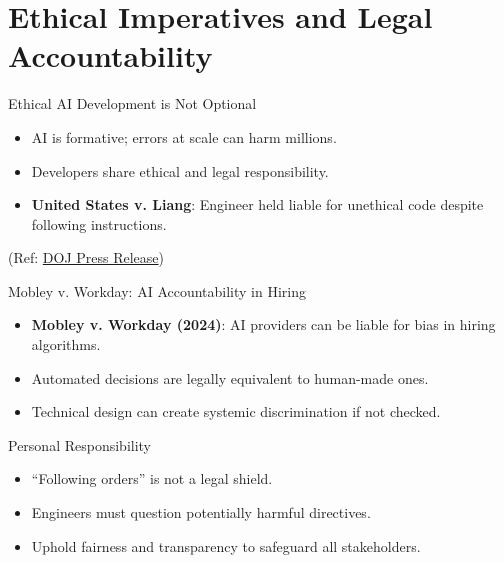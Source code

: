 \documentclass[aspectratio=169]{beamer}
\begin{document}
\section{Ethical Imperatives and Legal Accountability}

\begin{frame}{Ethical AI Development is Not Optional}
\begin{itemize}
\item AI is formative; errors at scale can harm millions.
\item Developers share ethical and legal responsibility.
\item \textbf{United States v. Liang}: Engineer held liable for unethical code despite following instructions.
\end{itemize}

\footnotesize (Ref: \href{https://www.justice.gov/opa/pr/volkswagen-engineer-pleads-guilty-his-role-conspiracy-cheat-us-emissions-tests}{DOJ Press Release})
\end{frame}

\begin{frame}{Mobley v. Workday: AI Accountability in Hiring}
\begin{itemize}
\item \textbf{Mobley v. Workday (2024)}: AI providers can be liable for bias in hiring algorithms.
\item Automated decisions are legally equivalent to human-made ones.
\item Technical design can create systemic discrimination if not checked.
\end{itemize}
\end{frame}

\begin{frame}{Personal Responsibility}
\begin{itemize}
\item “Following orders” is not a legal shield.
\item Engineers must question potentially harmful directives.
\item Uphold fairness and transparency to safeguard all stakeholders.
\end{itemize}
\end{frame}
\end{document}
